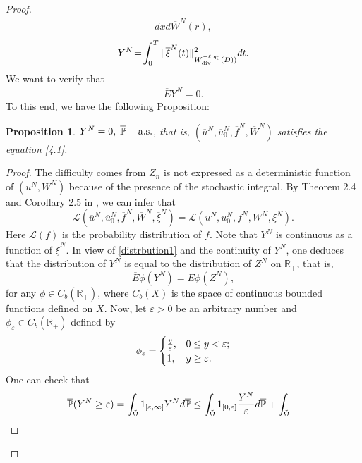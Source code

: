 \documentclass[reqno]{amsart}
\newtheorem{Proposition}{Proposition}[section]
\theoremstyle{definition}
\theoremstyle{remark}
\numberwithin{equation}{section} \allowdisplaybreaks
\begin{document}
\begin{proof}
\begin{align*}
dx d\overline{W}^N(r) ,
\end{align*}
\begin{align*}
Y^N\!=\!\int_0^T
\|\overline{\xi}^N(t)\|^2_{W_{\rm{div}}^{-\tilde{\ell},q_0}(D))}dt.
\end{align*}
We want to verify that
\begin{align*}
\overline{E}Y^{N}=0.
\end{align*}
To this end, we have the following Proposition:
\begin{Proposition}\label{prop4.2}
$Y^{N}=0,\;\overline{\mathbb{P}}-\mbox{\rm a.s.}$, that is,
$(\overline{u}^N,\overline{u}^N_0,\overline{f}^N,\overline{W}^N)$
satisfies the equation \eqref{4.1}.
\end{Proposition}
\begin{proof}The difficulty comes from $Z_n$ is not expressed as a
deterministic function of  $(u^N\!,W^N)$ because of the presence of
the stochastic integral. By Theorem 2.4 and Corollary 2.5 in
\cite{BH}, we can infer that
\begin{equation}\label{distrbution1}
\mathscr{L}(\overline{u}^N,\overline{u}^N_0,\overline{f}^N,\overline{W}^N,\overline{\xi}^N
)=\mathscr{L}(u^N,u^N_0,f^N,W^N,\xi^N).
\end{equation}
Here $\mathscr{L}(f)$ is the probability distribution of $f$. Note
that $Y^N$ is continuous as a function of $\overline{\xi}^N$. In
view of \eqref{distrbution1} and the continuity of $Y^N$, one
deduces that the distribution of $Y^N$ is equal to the distribution
of $Z^N$ on $\mathbb{R}_+$, that is,
\begin{equation}\label{distrbution2}
\overline{E}\phi(Y^N)=E\phi(Z^N),
\end{equation}
for any $\phi\in C_b(\mathbb{R}_+)$, where $C_b(X)$ is the space of
continuous bounded functions defined on $X$. Now, let
$\varepsilon>0$ be an arbitrary number and $\phi_\varepsilon\in
C_b(\mathbb{R}_+)$ defined by
\begin{equation*}
\phi_\varepsilon=
\begin{cases}
{y\over\varepsilon}, &0\le y<\varepsilon;\\
1, &y\ge \varepsilon.
\end{cases}
\end{equation*}
One can check that
\begin{equation*}
\begin{split}
\overline{\mathbb{P}}(Y^N\ge \varepsilon)&=\int_{\tilde{\Omega}}
1_{[\varepsilon,\infty]}Y^Nd\overline{\mathbb{P}}\le
\int_{\tilde{\Omega}}
1_{[0,\varepsilon]}{Y^N\over\varepsilon}d\overline{\mathbb{P}}+\int_{\tilde{\Omega}}

\end{split}
\end{equation*}
\end{proof}
\end{proof}
\end{document}
